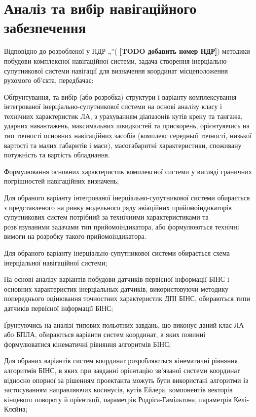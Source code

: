 \section{Аналіз та вибір навігаційного забезпечення}

Відповідно до розробленої у НДР „”( \textbf{[TODO добавить номер НДР]}) методики 
побудови комплексної навігаційної системи, задача створення 
інерціально-супутникової системи навігації для визначення координат 
місцеположення рухомого об'єкта, передбачає:

Обґрунтування, та вибір (або розробка) структури і варіанту комплексування 
інтегрованої інерціально-супутникової системи на основі аналізу класу і 
технічних характеристик ЛА, з урахуванням діапазонів кутів крену та тангажа, 
ударних навантажень, максимальних швидкостей та прискорень, орієнтуючись на 
тип точності основних навігаційних засобів (комплекс середньої точності, 
низької вартості та малих габаритів і маси), масогабаритні характеристики, 
споживану потужність та вартість обладнання. 

Формулювання основних характеристик комплексної системи у вигляді граничних 
погрішностей навігаційних визначень;

Для обраного варіанту інтегрованої інерціально-супутникової системи 
обирається з представленого на ринку модельного ряду авіаційних 
прийомоіндикаторів супутникових систем потрібний за технічними 
характеристиками та розв'язуваними задачами тип прийомоіндикатора, або 
формулюються технічні вимоги  на розробку такого прийомоіндикатора. 

Для обраного варіанту інерціально-супутникової системи обирається схема 
інерціальної навігаційної системи;

На основі аналізу варіантів побудови датчиків первісної інформації БІНС
і основних характеристик інерціальных датчиків, використовуючи методику 
попереднього оцінювання точностних характеристик ДПІ 
БІНС, обираються типи датчиків первісної інформації БІНС;

Ґрунтуючись на аналізі типових польотних завдань, що виконує даний клас ЛА
або БПЛА, обираються варіанти систем координат, в яких повинні формулюватися 
кінематичні рівняння алгоритмів БІНС;

Для обраних варіантів систем координат розробляються кінематичні рівняння 
алгоритмів БІНС, в яких при завданні орієнтацію зв'язаної системи координат 
відносно опорної за рішенням проектанта можуть бути використані алгоритми 
із застосуванням направляючих косинусів, кутів Ейлера, компонентів векторів 
кінцевого повороту й орієнтації, параметрів Родріга-Гамільтона, параметрів 
Келі-Клєйна;

